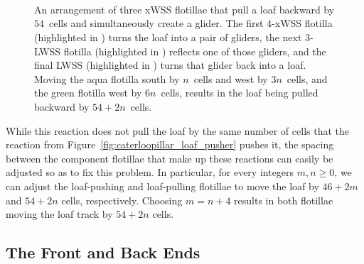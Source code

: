 \begin{figure}[!htb]
	\centering
	 \\[1em]
	
	 \\[1em]
	
	 \\[1em]
	
	
	\caption{An arrangement of three xWSS flotillae that pull a loaf backward by $54$~cells and simultaneously create a glider. The first $4$-xWSS flotilla (highlighted in ) turns the loaf into a pair of gliders, the next $3$-LWSS flotilla (highlighted in ) reflects one of those gliders, and the final LWSS (highlighted in ) turns that glider back into a loaf. Moving the aqua flotilla south by $n$~cells and west by $3n$~cells, and the green flotilla west by $6n$~cells, results in the loaf being pulled backward by $54 + 2n$~cells.}\label{fig:caterloopillar_loaf_puller}
\end{figure}

While this reaction does not pull the loaf by the same number of cells that the reaction from Figure~\ref{fig:caterloopillar_loaf_pusher} pushes it, the spacing between the component flotillae that make up these reactions can easily be adjusted so as to fix this problem. In particular, for every integers $m,n \geq 0$, we can adjust the loaf-pushing and loaf-pulling flotillae to move the loaf by $46 + 2m$ and $54 + 2n$ cells, respectively. Choosing $m = n + 4$ results in both flotillae moving the loaf track by $54 + 2n$ cells.


\subsection{The Front and Back Ends}\label{sec:caterloopillar_front_and_back}

